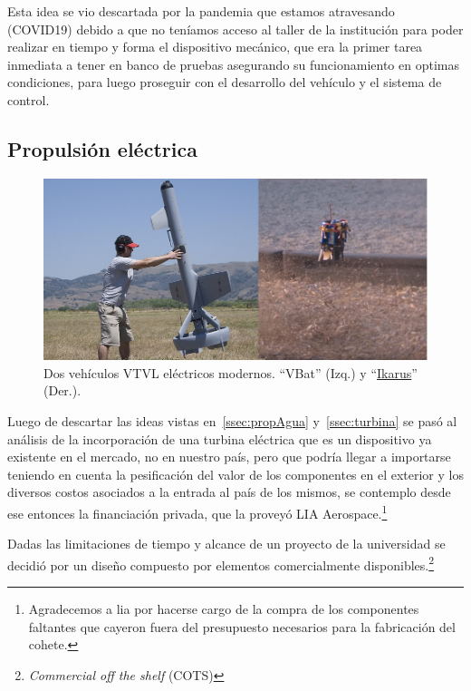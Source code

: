 Esta idea se vio descartada por la pandemia que estamos atravesando (COVID19) debido a que
no teníamos acceso al taller de la institución para poder realizar en tiempo y forma el
dispositivo mecánico, que era la primer tarea inmediata a tener en banco de pruebas
asegurando su funcionamiento en optimas condiciones, para luego proseguir con el desarrollo
del vehículo y el sistema de control.


\subsection{Propulsión eléctrica}\label{ssec:propelectrica}


\begin{figure}[htb]
    \centering
    \includegraphics[width=0.8\linewidth]{fig/vbat_icarus.png}
    \caption{Dos vehículos VTVL eléctricos modernos. ``VBat'' (Izq.) y ``\href{https://hackaday.com/2018/08/31/single-rotor-drone-a-thrust-vectoring-monocopter/}{Ikarus}'' (Der.).}
    \label{fig:vbat_icarus}
\end{figure}

Luego de descartar las ideas vistas en~\ref{ssec:propAgua} y~\ref{ssec:turbina} se pasó al análisis de la incorporación de una turbina eléctrica que es un dispositivo ya existente en el mercado, no en nuestro país, pero que podría llegar a importarse teniendo en cuenta la pesificación del valor de los componentes en el exterior y los diversos costos asociados a la entrada al país de los mismos, se contemplo desde ese entonces la financiación privada, que la proveyó LIA Aerospace.\footnote{Agradecemos a \gls{lia} por hacerse cargo de la compra de los componentes faltantes que cayeron fuera del presupuesto necesarios para la fabricación del cohete.} 

Dadas las limitaciones de tiempo y alcance de un proyecto de la universidad se decidió por un diseño compuesto por elementos comercialmente disponibles.\footnote{\textit{Commercial off the shelf} (COTS)}

\medskip

